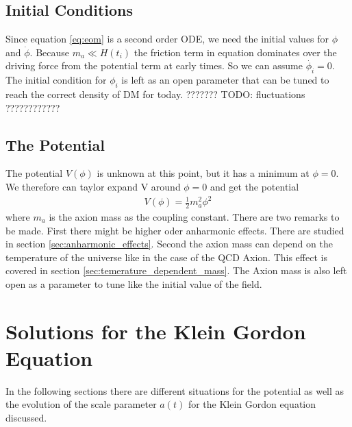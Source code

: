 \documentclass[a4paper]{article}
\begin{document}
\subsection{Initial Conditions}
Since equation \ref{eq:eom} is a second order ODE, we need the initial values
for $\phi$ and $\dot{\phi}$.
Because $m_a \ll H(t_i)$ the friction term in equation dominates over the
driving force from the potential term at early times.
So we can assume $\dot{\phi_i} = 0$.
The initial condition for $\phi_i$ is left as an open parameter that can be tuned to
reach the correct density of DM for today. ???????
TODO: fluctuations ????????????

\subsection{The Potential}
The potential $V(\phi)$ is unknown at this point, but it has a minimum
at $\phi = 0$. We therefore can taylor expand V around $\phi = 0$
and get the potential
\begin{align}
    \label{eq:potential}
    V(\phi) = \frac{1}{2} m_a^2 \phi^2
\end{align}
where $m_a$ is the axion mass as the coupling constant.
There are two remarks to be made.
First there might be higher oder anharmonic effects.
There are studied in section \ref{sec:anharmonic_effects}.
Second the axion mass can depend on the temperature of
the universe like in the case of the QCD Axion.
This effect is covered in section \ref{sec:temerature_dependent_mass}.
The Axion mass is also left open as a parameter to tune like
the initial value of the field.

\section{Solutions for the Klein Gordon Equation}
In the following sections there are different
situations for the potential as well as the
evolution of the scale parameter $a(t)$ for the
Klein Gordon equation discussed.
\end{document}
